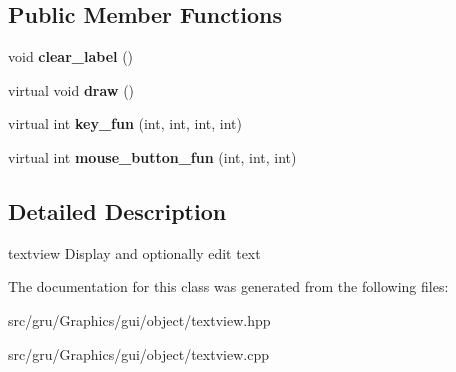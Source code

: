 \subsection*{\-Public \-Member \-Functions}
\begin{DoxyCompactItemize}
\item 
\hypertarget{classglutpp_1_1gui_1_1object_1_1textview_a926a96c785895a5c6a5e18c341b3e19f}{void {\bfseries clear\-\_\-label} ()}\label{classglutpp_1_1gui_1_1object_1_1textview_a926a96c785895a5c6a5e18c341b3e19f}

\item 
\hypertarget{classglutpp_1_1gui_1_1object_1_1textview_a535f913bc264bd4bb4072777109a1dc2}{virtual void {\bfseries draw} ()}\label{classglutpp_1_1gui_1_1object_1_1textview_a535f913bc264bd4bb4072777109a1dc2}

\item 
\hypertarget{classglutpp_1_1gui_1_1object_1_1textview_ae100e01abe28a1028432c40a90348b01}{virtual int {\bfseries key\-\_\-fun} (int, int, int, int)}\label{classglutpp_1_1gui_1_1object_1_1textview_ae100e01abe28a1028432c40a90348b01}

\item 
\hypertarget{classglutpp_1_1gui_1_1object_1_1textview_ad4b0c55f05105dc27621052c479956fd}{virtual int {\bfseries mouse\-\_\-button\-\_\-fun} (int, int, int)}\label{classglutpp_1_1gui_1_1object_1_1textview_ad4b0c55f05105dc27621052c479956fd}

\end{DoxyCompactItemize}


\subsection{\-Detailed \-Description}
textview \-Display and optionally edit text 

\-The documentation for this class was generated from the following files\-:\begin{DoxyCompactItemize}
\item 
src/gru/\-Graphics/gui/object/textview.\-hpp\item 
src/gru/\-Graphics/gui/object/textview.\-cpp\end{DoxyCompactItemize}
